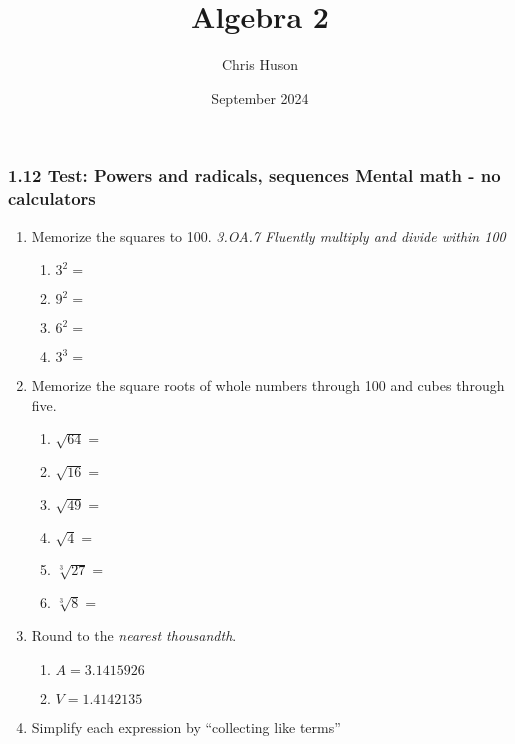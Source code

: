\documentclass[12pt, twoside]{article}
\title{Algebra 2}
\author{Chris Huson}
\date{September 2024}
\begin{document}
\subsubsection*{1.12 Test: Powers and radicals, sequences \hfill Mental math - no calculators}
\begin{enumerate}[itemsep=0.5cm]

\item Memorize the squares to 100. \hfill \emph{3.OA.7 Fluently multiply and divide within 100}
    \begin{multicols}{2}
        \begin{enumerate}[itemsep=0.5cm]
            \item $3^2 =$
            \item $9^2 =$
            \item $6^2 =$
            \item $3^3 =$
        \end{enumerate}
    \end{multicols}

\item Memorize the square roots of whole numbers through 100 and cubes through five.
    \begin{multicols}{2}
        \begin{enumerate}[itemsep=0.5cm]
            \item $\sqrt{64} =$
            \item $\sqrt{16} =$
            \item $\sqrt{49} =$
            \item $\sqrt{4} =$
            \item $\sqrt[3]{27} =$
            \item $\sqrt[3]{8} =$
          \end{enumerate}
    \end{multicols}

\item Round to the \emph{nearest thousandth}.
  \begin{multicols}{2}
  \begin{enumerate}[itemsep=1.5cm]
    \item $A=3.1415926$
    \item $V=1.4142135$
  \end{enumerate}
  \end{multicols} \vspace{0.5cm}

\item Simplify each expression by ``collecting like terms''
\begin{enumerate}[itemsep=2cm]
  \end{enumerate} \vspace{1cm}


\end{enumerate}
\end{document}
